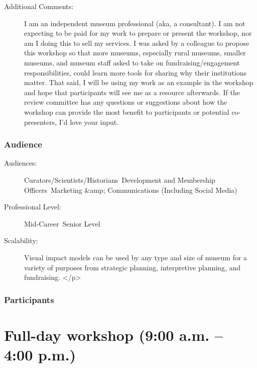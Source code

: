 \documentclass{report}
\begin{document}
\begin{description}
                    \item [Additional Comments: ]I am an independent museum professional (aka, a consultant). I am not expecting to be paid for my work to prepare or present the workshop, nor am I doing this to sell my services. I was asked by a colleague to propose this workshop so that more museums, especially rural museums, smaller museums, and museum staff asked to take on fundraising/engagement responsibilities, could learn more tools for sharing why their institutions matter. That said, I will be using my work as an example in the workshop and hope that participants will see me as a resource afterwards. If the review committee has any questions or suggestions about how the workshop can provide the most benefit to participants or potential co-presenters, I’d love your input.

                \end{description}
              \subsection*{Audience}
                \begin{description}
                  \item [Audiences:]Curators/Scientists/Historians~Development and Membership Officers~Marketing &amp; Communications (Including Social Media)~
                  \item[Professional Level:]Mid-Career~Senior Level~
                \item[Scalability:] Visual impact models can be used by any type and size of museum for a variety of purposes from strategic planning, interpretive planning, and fundraising.
</p>
							
              \end{description}
            \subsection*{Participants}
              





    
  

  
    \newpage
    \chapter*{ Full-day workshop (9:00 a.m. – 4:00 p.m.) }

      
        
\end{document}
